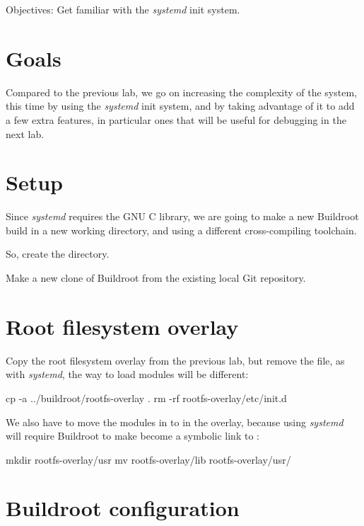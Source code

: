   {Objectives: Get familiar with the {\em systemd} init system.}

\section{Goals}

Compared to the previous lab, we go on increasing the complexity
of the system, this time by using the {\em systemd} init system,
and by taking advantage of it to add a few extra features, in particular
ones that will be useful for debugging in the next lab.

\section{Setup}

Since {\em systemd} requires the GNU C library, we are going
to make a new Buildroot build in a new working directory, and
using a different cross-compiling toolchain.

So, create the  directory.

Make a new clone of Buildroot from the existing local Git repository.

\section{Root filesystem overlay}

Copy the root filesystem overlay from the previous lab, but remove
the  file, as with {\em systemd}, the
way to load modules will be different:

\begin{bashinput}
cp -a ../buildroot/rootfs-overlay .
rm -rf rootfs-overlay/etc/init.d
\end{bashinput}

We also have to move the modules in  to
 in the overlay, because using {\em systemd}
will require Buildroot to make  become a symbolic
link to :

\begin{bashinput}
mkdir rootfs-overlay/usr
mv rootfs-overlay/lib rootfs-overlay/usr/
\end{bashinput}

\section{Buildroot configuration}

